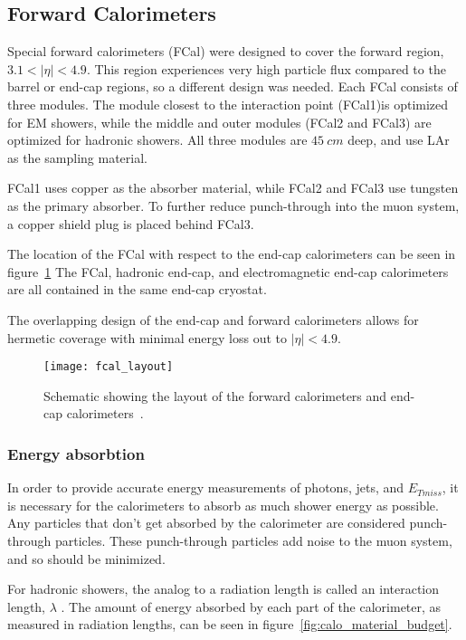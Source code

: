 \subsection{Forward Calorimeters}\label{subsec:fcal}

Special forward calorimeters (FCal) were designed to cover the forward region, $3.1 < |\eta| < 4.9$.
This region experiences very high particle flux compared to the barrel or end-cap regions, so a different design was needed.
Each FCal consists of three modules.
The module closest to the interaction point (FCal1)is optimized for EM showers,
while the middle and outer modules (FCal2 and FCal3) are optimized for hadronic showers.
All three modules are $45~cm$ deep, and use LAr as the sampling material.

FCal1 uses copper as the absorber material, while FCal2 and FCal3 use tungsten as the primary absorber.
To further reduce punch-through into the muon system, a copper shield plug is placed behind FCal3.

The location of the FCal with respect to the end-cap calorimeters can be seen in figure~\ref{fig:fcal_layout}
The FCal, hadronic end-cap, and electromagnetic end-cap calorimeters are all contained in the same end-cap cryostat.

The overlapping design of the end-cap and forward calorimeters allows for hermetic coverage with minimal energy loss out to $|\eta| < 4.9$.

\begin{figure}[!ht]\centering
\texttt{[image: fcal\_layout]}
\caption{Schematic showing the layout of the forward calorimeters and end-cap calorimeters~\cite{atlas-detector-2008}.}
\label{fig:fcal_layout}
\end{figure}

\subsubsection{Energy absorbtion}
In order to provide accurate energy measurements of photons, jets, and $E_{Tmiss}$,
it is necessary for the calorimeters to absorb as much shower energy as possible.
Any particles that don't get absorbed by the calorimeter are considered punch-through particles.
These punch-through particles add noise to the muon system, and so should be minimized.

For hadronic showers, the analog to a radiation length is called an interaction length, $\lambda$ .
The amount of energy absorbed by each part of the calorimeter, as measured in radiation lengths, can be seen in figure~\ref{fig:calo_material_budget}.

